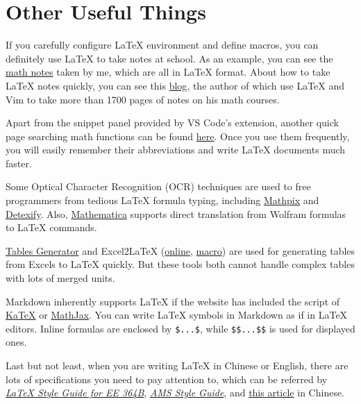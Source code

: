 \documentclass[english]{../TexTemplate/thesis}
\begin{document}
\section{Other Useful Things}
If you carefully configure \LaTeX{} environment and define macros, you can definitely use \LaTeX{} to take notes at school. As an example, you can see the \href{https://github.com/chhzh123/Notes-of-Math}{math notes} taken by me, which are all in \LaTeX{} format.
About how to take \LaTeX{} notes quickly, you can see this \href{https://castel.dev/post/lecture-notes-1/}{blog}, the author of which use \LaTeX{} and Vim to take more than 1700 pages of notes on his math courses.

Apart from the snippet panel provided by VS Code's extension, another quick page searching math functions can be found \href{https://katex.org/docs/supported.html}{here}. Once you use them frequently, you will easily remember their abbreviations and write \LaTeX{} documents much faster.

Some Optical Character Recognition (OCR) techniques are used to free programmers from tedious \LaTeX{} formula typing, including \href{https://mathpix.com/}{Mathpix} and \href{http://detexify.kirelabs.org/classify.html}{Detexify}.
Also, \href{https://www.wolfram.com/mathematica}{Mathematica} supports direct translation from Wolfram formulas to \LaTeX{} commands.

\href{https://www.tablesgenerator.com/}{Tables Generator} and Excel2LaTeX (\href{http://excel2latex.com/}{online}, \href{https://ctan.org/pkg/excel2latex?lang=en}{macro}) are used for generating tables from Excels to \LaTeX{} quickly. But these tools both cannot handle complex tables with lots of merged units.

Markdown inherently supports \LaTeX{} if the website has included the script of \href{https://katex.org/}{KaTeX} or \href{https://www.mathjax.org/}{MathJax}. You can write \LaTeX{} symbols in Markdown as if in \LaTeX{} editors. Inline formulas are enclosed by \verb'$...$', while \verb'$$...$$' is used for displayed ones.

Last but not least, when you are writing \LaTeX{} in Chinese or English, there are lots of specifications you need to pay attention to, which can be referred by \href{https://web.stanford.edu/class/ee364b/latex_templates/template_notes.pdf}{\emph{\LaTeX{} Style Guide for EE 364B}}, \href{https://www.ams.org/publications/authors/AMS-StyleGuide-online.pdf}{\emph{AMS Style Guide}}, and \href{https://zhuanlan.zhihu.com/p/29587837}{this article} in Chinese.
\end{document}
